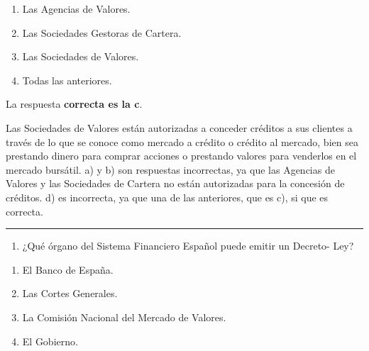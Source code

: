 \documentclass[
  letterpaper,
  DIV=11,
  numbers=noendperiod]{scrreprt}
\providecommand{\tightlist}{%
  \setlength{\itemsep}{0pt}\setlength{\parskip}{0pt}}\usepackage{longtable,booktabs,array}
\begin{document}
\begin{enumerate}
\def\labelenumi{\alph{enumi})}
\item
  Las Agencias de Valores.
\item
  Las Sociedades Gestoras de Cartera.
\item
  Las Sociedades de Valores.
\item
  Todas las anteriores.
\end{enumerate}

\begin{tcolorbox}[enhanced jigsaw, left=2mm, opacityback=0, colback=white, breakable, arc=.35mm, bottomrule=.15mm, rightrule=.15mm, toprule=.15mm, leftrule=.75mm, colframe=quarto-callout-tip-color-frame]
\begin{minipage}[t]{5.5mm}
\textcolor{quarto-callout-tip-color}{\faLightbulb}
\end{minipage}%
\begin{minipage}[t]{\textwidth - 5.5mm}

La respuesta \textbf{correcta es la c}.

Las Sociedades de Valores están autorizadas a conceder créditos a sus
clientes a través de lo que se conoce como mercado a crédito o crédito
al mercado, bien sea prestando dinero para comprar acciones o prestando
valores para venderlos en el mercado bursátil. a) y b) son respuestas
incorrectas, ya que las Agencias de Valores y las Sociedades de Cartera
no están autorizadas para la concesión de créditos. d) es incorrecta, ya
que una de las anteriores, que es c), si que es correcta.

\end{minipage}%
\end{tcolorbox}

\begin{center}\rule{0.5\linewidth}{0.5pt}\end{center}

\begin{enumerate}
\def\labelenumi{\arabic{enumi}.}
\setcounter{enumi}{27}
\tightlist
\item
  ¿Qué órgano del Sistema Financiero Español puede emitir un Decreto-
  Ley?
\end{enumerate}

\begin{enumerate}
\def\labelenumi{\alph{enumi})}
\item
  El Banco de España.
\item
  Las Cortes Generales.
\item
  La Comisión Nacional del Mercado de Valores.
\item
  El Gobierno.
\end{enumerate}
\end{document}
